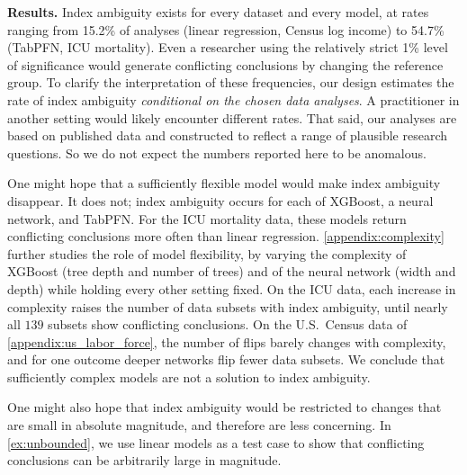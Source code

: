 \textbf{Results.} 
Index ambiguity exists for every dataset and every model, at rates ranging from 15.2\% of analyses (linear regression, Census log income) to 54.7\% (TabPFN, ICU mortality).
Even a researcher using the relatively strict 1\% level of significance would generate conflicting conclusions by changing the reference group.
To clarify the interpretation of these frequencies, our design estimates the rate of index ambiguity \emph{conditional on the chosen data analyses}. 
A practitioner in another setting would likely encounter different rates.
That said, our analyses are based on published data and constructed to reflect a range of plausible research questions.
So we do not expect the numbers reported here to be anomalous.

One might hope that a sufficiently flexible model would make index ambiguity disappear. 
It does not; index ambiguity occurs for each of XGBoost, a neural network, and TabPFN. 
For the ICU mortality data, these models return conflicting conclusions more often than linear regression.
\cref{appendix:complexity} further studies the role of model flexibility, by varying the complexity of XGBoost (tree depth and number of trees) and of the neural network (width and depth) while holding every other setting fixed. 
On the ICU data, each increase in complexity raises the number of data subsets with index ambiguity, until nearly all $139$ subsets show conflicting conclusions. 
On the U.S.\ Census data of \cref{appendix:us_labor_force}, the number of flips barely changes with complexity, and for one outcome deeper networks flip fewer data subsets. 
We conclude that sufficiently complex models are not a solution to index ambiguity.

One might also hope that index ambiguity would be restricted to changes that are small in absolute magnitude, and therefore are less concerning.
In \cref{ex:unbounded}, we use linear models as a test case to show that conflicting conclusions can be arbitrarily large in magnitude.

